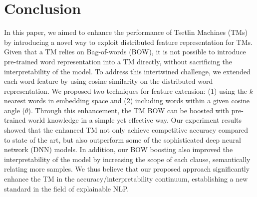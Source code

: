 \documentclass[11pt]{article}
\begin{document}
\section{Conclusion}\label{conc}
In this paper, we aimed to enhance the performance of Tsetlin Machines (TMs) by introducing a novel way to exploit distributed feature representation for TMs. Given that a TM relies on Bag-of-words (BOW), it is not possible to introduce pre-trained word representation into a TM directly, without sacrificing the interpretability of the model. To address this intertwined challenge, we extended each word feature by using cosine similarity on the distributed word representation. We proposed two techniques for feature extension: (1) using the $k$ nearest words in embedding space and (2) including words within a given cosine angle ($\theta$). Through this enhancement, the TM BOW can be boosted with pre-trained world knowledge in a simple yet effective way. Our experiment results showed that the enhanced TM not only achieve competitive accuracy compared to state of the art, but also outperform some of the sophisticated deep neural network (DNN) models. In addition, our BOW boosting  also improved the interpretability of the model by increasing the scope of each clause, semantically relating more samples. We thus believe that our proposed approach significantly enhance the TM in the accuracy/interpretability continuum, establishing a new standard in the field of explainable NLP.




\end{document}
